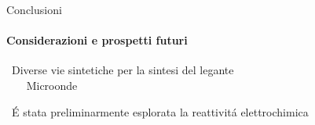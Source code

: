 \documentclass[aspectration=169]{beamer}
\newcommand{\B}{\textcolor{maincolor}{\textbullet}}
\begin{document}
\begin{frame}{Conclusioni}
	\framesubtitle{Considerazioni e prospetti futuri}
	\B \ Diverse vie sintetiche per la sintesi del legante \\
	~~ \B \ Microonde


	\vspace{0.5cm}

	\B \ É stata preliminarmente esplorata la reattivitá elettrochimica
\end{frame}

\backmatter
\end{document}
